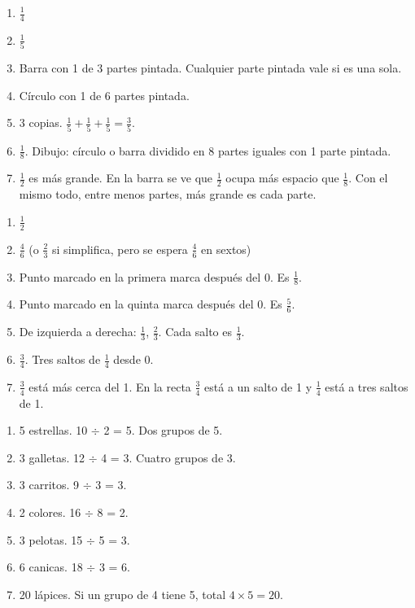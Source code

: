 \begin{enumerate}
\item $\frac{1}{4}$
\item $\frac{1}{5}$
\item Barra con 1 de 3 partes pintada. Cualquier parte pintada vale si es una sola.
\item Círculo con 1 de 6 partes pintada.
\item 3 copias. $\frac{1}{5}+\frac{1}{5}+\frac{1}{5}=\frac{3}{5}$.
\item $\frac{1}{8}$. Dibujo: círculo o barra dividido en 8 partes iguales con 1 parte pintada.
\item $\frac{1}{2}$ es más grande. En la barra se ve que $\frac{1}{2}$ ocupa más espacio que $\frac{1}{8}$. Con el mismo todo, entre menos partes, más grande es cada parte.
\end{enumerate}

\begin{enumerate}
\item $\frac{1}{2}$
\item $\frac{4}{6}$ (o $\frac{2}{3}$ si simplifica, pero se espera $\frac{4}{6}$ en sextos)
\item Punto marcado en la primera marca después del 0. Es $\frac{1}{8}$.
\item Punto marcado en la quinta marca después del 0. Es $\frac{5}{6}$.
\item De izquierda a derecha: $\frac{1}{3}$, $\frac{2}{3}$. Cada salto es $\frac{1}{3}$.
\item $\frac{3}{4}$. Tres saltos de $\frac{1}{4}$ desde 0.
\item $\frac{3}{4}$ está más cerca del 1. En la recta $\frac{3}{4}$ está a un salto de 1 y $\frac{1}{4}$ está a tres saltos de 1.
\end{enumerate}

\begin{enumerate}
\item 5 estrellas. 10 $\div$ 2 = 5. Dos grupos de 5.
\item 3 galletas. 12 $\div$ 4 = 3. Cuatro grupos de 3.
\item 3 carritos. 9 $\div$ 3 = 3.
\item 2 colores. 16 $\div$ 8 = 2.
\item 3 pelotas. 15 $\div$ 5 = 3.
\item 6 canicas. 18 $\div$ 3 = 6.
\item 20 lápices. Si un grupo de 4 tiene 5, total $4 \times 5 = 20$.
\end{enumerate}

